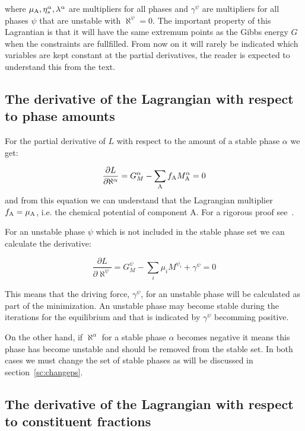 \documentclass[12pt]{article}
\begin{document}
\noindent
where $\mu_{\rm A}, \eta_{s}^{\alpha}, \lambda^{\alpha}$ are
multipliers for all phases and $\gamma^{\psi}$ are multipliers for all
phases $\psi$ that are unstable with $\aleph^{\psi}=0$.  The
important property of this Lagrantian is that it will have the same
extremum points as the Gibbs energy $G$ when the constraints are
fullfilled.  From now on it will rarely be indicated which variables
are kept constant at the partial derivatives, the reader is expected
to understand this from the text.

\subsection{The derivative of the Lagrangian with respect to phase amounts}

For the partial derivative of $L$ with respect to the amount of a
stable phase $\alpha$ we get:

\begin{equation}
\frac{\partial L}{\partial \aleph^{\alpha}} = G^{\alpha}_M -
\sum_{\rm A} f_{\rm A} M^{\alpha}_{\rm A} = 0
\end{equation}
and from this equation we can understand that the Lagrangian
multiplier $f_{\rm A} = \mu_{\rm A}$, i.e. the chemical potential of
component A.  For a rigorous proof see~\cite{81Hil}.

For an unstable phase $\psi$ which is not included in the stable
phase set we can calculate the derivative:

\begin{equation}
\frac{\partial L}{\partial \aleph^{\psi}} = G^{\psi}_M -
\sum_i \mu_i M^{\psi_i} + \gamma^{\psi} = 0 \label{eq:dgm1}
\end{equation}

This means that the driving force, $\gamma^{\psi}$, for an unstable
phase will be calculated as part of the minimization.  An unstable
phase may become stable during the iterations for the equilibrium and
that is indicated by $\gamma^{\psi}$ becomming positive.  

On the other hand, if $\aleph^{\alpha}$ for a stable phase $\alpha$
becomes negative it means this phase has become unstable and should be
removed from the stable set.  In both cases we must change the set of
stable phases as will be discussed in section~\ref{sc:changeps}.

\subsection{The derivative of the Lagrangian with respect to 
constituent fractions}
\end{document}
